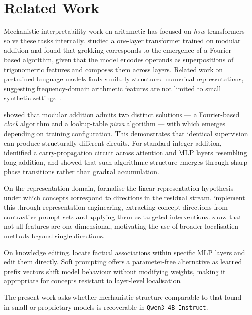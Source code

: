 \chapter{Related Work}
\label{sec:related}

Mechanistic interpretability work on arithmetic has focused on \textit{how} transformers solve 
these tasks internally. \citet{nanda2023progress} studied a one-layer transformer trained on 
modular addition and found that grokking corresponds to the emergence of a Fourier-based 
algorithm, given that the model encodes operands as superpositions of trigonometric features and composes 
them across layers. Related work on pretrained language models finds similarly structured 
numerical representations, suggesting frequency-domain arithmetic features are not limited to 
small synthetic settings~\citep{zhou2024fourier}.

\citet{zhong2023clock} showed that modular addition admits two distinct solutions --- a 
Fourier-based \textit{clock} algorithm and a lookup-table \textit{pizza} algorithm --- with which emerges 
depending on training configuration. This demonstrates that identical supervision can produce 
structurally different circuits. For standard integer addition, \citet{quirke2024understanding} 
identified a carry-propagation circuit across attention and MLP layers resembling long addition, 
and \citet{musat2024clustering} showed that such algorithmic structure emerges through sharp 
phase transitions rather than gradual accumulation.

On the representation domain, \citet{park2023linear} formalise the linear representation 
hypothesis, under which concepts correspond to directions in the residual stream. 
\citet{zou2025representationengineeringtopdownapproach} implement this through 
representation engineering, extracting concept directions from contrastive prompt sets and 
applying them as targeted interventions. \citet{engels2024notall} show that not all features 
are one-dimensional, motivating the use of broader localisation methods beyond single directions.

On knowledge editing, \citet{meng2023locatingeditingfactualassociations} locate factual 
associations within specific MLP layers and edit them directly. Soft prompting 
\citep{panickssery2024steeringllama2contrastive} offers a parameter-free alternative as learned 
prefix vectors shift model behaviour without modifying weights, making it appropriate for concepts resistant to layer-level localisation.

The present work asks whether mechanistic structure comparable to that found in small or 
proprietary models is recoverable in \texttt{Qwen3-4B-Instruct}. 